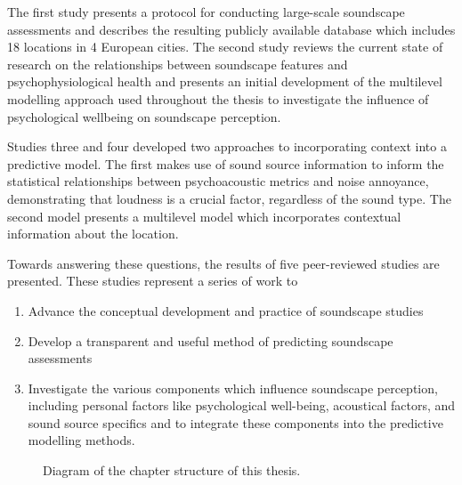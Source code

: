 The first study presents a protocol for conducting large-scale soundscape assessments and describes the resulting publicly available database which includes 18 locations in 4 European cities. The second study reviews the current state of research on the relationships between soundscape features and psychophysiological health and presents an initial development of the multilevel modelling approach used throughout the thesis to investigate the influence of psychological wellbeing on soundscape perception.

Studies three and four developed two approaches to incorporating context into a predictive model. The first makes use of sound source information to inform the statistical relationships between psychoacoustic metrics and noise annoyance, demonstrating that loudness is a crucial factor, regardless of the sound type. The second model presents a multilevel model which incorporates contextual information about the location. 

Towards answering these questions, the results of five %
peer-reviewed studies are presented. These studies represent a series of work to

\begin{enumerate}
  \item Advance the conceptual development and practice of soundscape studies
  \item Develop a transparent and useful method of predicting soundscape assessments
  \item Investigate the various components which influence soundscape perception, including personal factors like psychological well-being, acoustical factors, and sound source specifics and to integrate these components into the predictive modelling methods.
\end{enumerate}

\begin{figure}
  \caption[]{Diagram of the chapter structure of this thesis. \label{fig:thesisStructure}}
\end{figure}